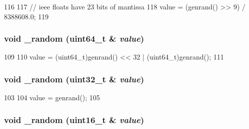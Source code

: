 \begin{DoxyCode}
116     {
117         // ieee floats have 23 bits of mantissa
118         value = (genrand() >> 9) / 8388608.0;
119     }
\end{DoxyCode}
\hypertarget{classRandom_a7719e6e66fa0fc7b414657cae0ae179e}{
\subsubsection[{\_\-random}]{\setlength{\rightskip}{0pt plus 5cm}void \_\-random (uint64\_\-t \& {\em value})}}
\label{classRandom_a7719e6e66fa0fc7b414657cae0ae179e}



\begin{DoxyCode}
109     {
110         value = (uint64_t)genrand() << 32 | (uint64_t)genrand();
111     }
\end{DoxyCode}
\hypertarget{classRandom_adf77c07c3dd17f1a3503bde1577a465d}{
\subsubsection[{\_\-random}]{\setlength{\rightskip}{0pt plus 5cm}void \_\-random ({\bf uint32\_\-t} \& {\em value})}}
\label{classRandom_adf77c07c3dd17f1a3503bde1577a465d}



\begin{DoxyCode}
103     {
104         value = genrand();
105     }
\end{DoxyCode}
\hypertarget{classRandom_ada2f2689f2bb916337c7407d50629a17}{
\subsubsection[{\_\-random}]{\setlength{\rightskip}{0pt plus 5cm}void \_\-random (uint16\_\-t \& {\em value})}}
\label{classRandom_ada2f2689f2bb916337c7407d50629a17}



